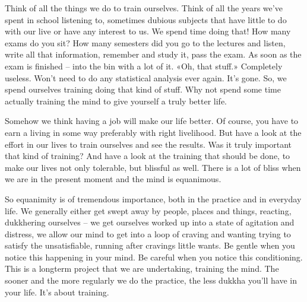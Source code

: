 \documentclass[letterpaper,10pt,english]{sphinxmanual}
\begin{document}
\sphinxAtStartPar
Think of all the things we do to train ourselves. Think of all the years
we’ve  spent  in  school  listening  to,  sometimes  dubious  subjects  that  have
little  to  do  with  our  live  or  have  any  interest  to  us. We  spend  time  doing
that! How many exams do you sit? How many semesters did you go to the
lectures and listen, write all that information, remember and study it, pass
the exam. As soon as the exam is finished – into the bin with a lot of it. «Oh,
that  stuff.»  Completely  useless.  Won’t  need  to  do  any  statistical  analysis
ever  again.  It’s  gone.  So,  we  spend  ourselves  training  doing  that  kind  of
stuff. Why not spend some time actually training the mind to give yourself
a truly better life.

\sphinxAtStartPar
Somehow we think having a job will make our life better. Of course,
you have to earn a living in some way preferably with right livelihood. But
  have a look at the effort in our lives to train ourselves and see the results.
Was it truly important that kind of training? And have a look at the training
that should be done, to make our lives not only tolerable, but blissful as well.
There is a lot of bliss when we are in the present moment and the mind is
equanimous.

\sphinxAtStartPar
So equanimity is of tremendous importance, both in the practice and
in everyday life. We generally either get swept away by people, places and
things, reacting, dukkhering ourselves – we get ourselves worked up into a
state of agitation and distress, we allow our mind to get into a loop of craving
and wanting trying to satisfy the unsatisfiable, running after cravings little
wants. Be gentle when you notice this happening in your mind. Be careful
when you notice this conditioning. This is a long\sphinxhyphen{}term project that we are
undertaking, training the mind. The sooner and the more regularly we do the
practice, the less dukkha you’ll have in your life. It’s about training.
\end{document}
